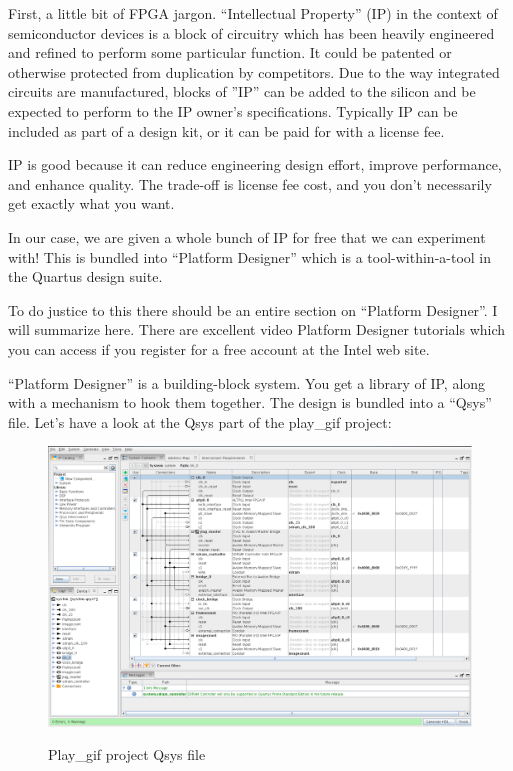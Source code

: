 First, a little bit of FPGA jargon.  ``Intellectual Property'' (IP) in the context of semiconductor devices is a block of circuitry which has been heavily engineered and refined to perform some particular function.  It could be patented or otherwise protected from duplication by competitors.
Due to the way integrated circuits are manufactured, blocks of ''IP'' can be added to the silicon and be expected to perform to the IP owner's specifications.  Typically IP can be included as part of a design kit, or it can be paid for with a license fee.

IP is good because it can reduce engineering design effort, improve performance, and enhance quality.  The trade-off is license fee cost, and you don't necessarily get exactly what you want.

In our case, we are given a whole bunch of IP for free that we can experiment with!  This is bundled into ``Platform Designer'' which is a tool-within-a-tool in the Quartus design suite.

To do justice to this there should be an entire section on ``Platform Designer''.  I will summarize here.  There are excellent video Platform Designer tutorials which you can access if you register for a free account at the Intel web site.

``Platform Designer'' is a building-block system.  You get a library of IP, along with a mechanism to hook them together.  The design is bundled into a ``Qsys'' file.    Let's have a look at the Qsys part of the play\_gif project:

\begin{figure}[h]
	\centering
	\includegraphics[width=1.0\textwidth]{images/platform_designer.pdf}
	\centering\bfseries
	\caption{Play\_gif project Qsys file}
\end{figure}

